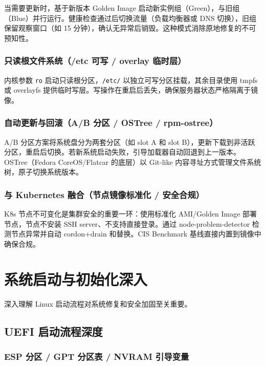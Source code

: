 \documentclass[12pt,UTF8]{ctexbook}
\begin{document}
当需要更新时，基于新版本 Golden Image 启动新实例组（Green），与旧组（Blue）并行运行。健康检查通过后切换流量（负载均衡器或 DNS 切换），旧组保留观察窗口（如 15 分钟），确认无异常后销毁。这种模式消除原地修复的不可预知性。

    \subsection{只读根文件系统（/etc 可写 / overlay 临时层）}

内核参数 \verb|ro| 启动只读根分区，\verb|/etc/| 以独立可写分区挂载，其余目录使用 tmpfs 或 overlayfs 提供临时写层。写操作在重启后丢失，确保服务器状态严格隔离于镜像。

    \subsection{自动更新与回滚（A/B 分区 / OSTree / rpm-ostree）}

A/B 分区方案将系统盘分为两套分区（如 slot A 和 slot B），更新下载到非活跃分区，重启后切换。若新系统启动失败，引导加载器自动回退到上一版本。OSTree（Fedora CoreOS/Flatcar 的底层）以 Git-like 内容寻址方式管理文件系统树，原子切换系统版本。

    \subsection{与 Kubernetes 融合（节点镜像标准化 / 安全合规）}

K8s 节点不可变化是集群安全的重要一环：使用标准化 AMI/Golden Image 部署节点，节点不安装 SSH server、不支持直接登录。通过 node-problem-detector 检测节点异常并自动 cordon+drain 和替换。CIS Benchmark 基线直接内置到镜像中确保合规。


\chapter{系统启动与初始化深入}
\label{chap:boot-init-deep}

深入理解 Linux 启动流程对系统修复和安全加固至关重要。

  \section{UEFI 启动流程深度}
    \subsection{ESP 分区 / GPT 分区表 / NVRAM 引导变量}
\end{document}
